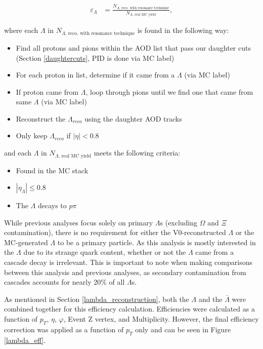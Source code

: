\documentclass[ALICE,manyauthors]{ALICE_analysis_notes}
\begin{document}
\begin{align*}
	\varepsilon_{\Lambda} &=  \frac{N_{\Lambda\text{, reco. with resonance technique}}}{N_{\Lambda\text{, real MC yield}}},
\end{align*}

where each $\Lambda$ in $N_{\Lambda\text{, reco. with resonance technique}}$ is found in the following way:

\begin{itemize}
	\item Find all protons and pions within the AOD list that pass our daughter cuts (Section \ref{daughtercuts}, PID is done via MC label)
	\item For each proton in list, determine if it came from a $\Lambda$ (via MC label)
	\item If proton came from $\Lambda$, loop through pions until we find one that came from same $\Lambda$ (via MC label)
	\item Reconstruct the $\Lambda_{reco}$ using the daughter AOD tracks
	\item Only keep $\Lambda_{reco}$ if $|\eta| < 0.8$
\end{itemize}

and each $\Lambda$ in $N_{\Lambda\text{, real MC yield}}$ meets the following criteria:

\begin{itemize}
	\item Found in the MC stack
	\item $|\eta_{\Lambda}| \leq 0.8$
	\item The $\Lambda$ decays to $p\pi$
\end{itemize}



While previous analyses focus solely on primary $\Lambda$s (excluding $\Omega$ and $\Xi$ contamination), there is no requirement for either the V0-reconstructed $\Lambda$ or the MC-generated $\Lambda$ to be a primary particle. As this analysis is mostly interested in the $\Lambda$ due to its strange quark content, whether or not the $\Lambda$ came from a cascade decay is irrelevant. This is important to note when making comparisons between this analysis and previous analyses, as secondary contamination from cascades accounts for nearly 20\% of all $\Lambda$s.

As mentioned in Section \ref{lambda_reconstruction}, both the $\Lambda$ and the $\bar{\Lambda}$ were combined together for this efficiency calculation. Efficiencies were calculated as a function of $p_T$, $\eta$, $\varphi$, Event Z vertex, and Multiplicity. However, the final efficiency correction was applied as a function of $p_T$ only and can be seen in Figure \ref{lambda_eff}.
\end{document}

